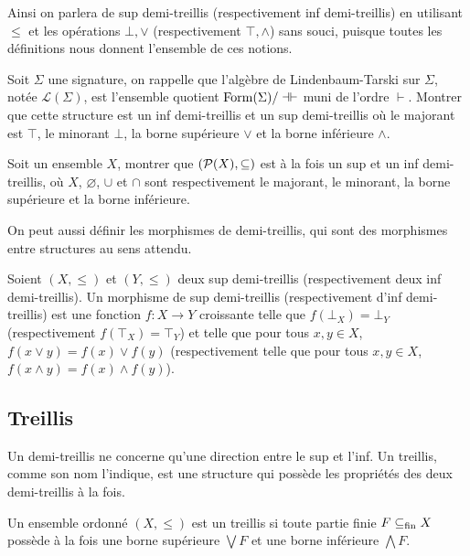 Ainsi on parlera de sup demi-treillis (respectivement inf demi-treillis) en
utilisant $\leq$ et les opérations $\bot,\lor$ (respectivement $\top,\land$) sans
souci, puisque toutes les définitions nous donnent l'ensemble de ces notions.

\begin{exercise}
  Soit $\Sigma$ une signature, on rappelle que l'algèbre de Lindenbaum-Tarski
  sur $\Sigma$, notée $\mathcal L(\Sigma)$, est l'ensemble quotient
  $\operatorname{Form}(\Sigma)/\dashv\vdash$ muni de l'ordre $\vdash$. Montrer que
  cette structure est un inf demi-treillis et un sup demi-treillis où le majorant
  est $\top$, le minorant $\bot$, la borne supérieure $\lor$ et la borne
  inférieure $\land$.
\end{exercise}

\begin{exercise}
  Soit un ensemble $X$, montrer que $(\mathcal{P}(X),\subseteq)$ est à la fois un
  sup et un inf demi-treillis, où $X$, $\varnothing$, $\cup$ et $\cap$ sont
  respectivement le majorant, le minorant, la borne supérieure et la borne
  inférieure.
\end{exercise}

On peut aussi définir les morphismes de demi-treillis, qui sont des morphismes
entre structures au sens attendu.

\begin{definition}
  Soient $(X,\leq)$ et $(Y,\leq)$ deux sup demi-treillis (respectivement deux
  inf demi-treillis). Un morphisme de sup demi-treillis (respectivement d'inf
  demi-treillis) est une fonction $f : X \to Y$ croissante telle que
  $f(\bot_X) = \bot_Y$ (respectivement $f(\top_X) = \top_Y$) et telle que pour
  tous $x,y\in X$, $f(x\lor y) = f(x)\lor f(y)$ (respectivement telle que pour
  tous $x,y\in X$, $f(x\land y) = f(x)\land f(y)$).
\end{definition}

\subsection{Treillis}

Un demi-treillis ne concerne qu'une direction entre le sup et l'inf. Un treillis,
comme son nom l'indique, est une structure qui possède les propriétés des deux
demi-treillis à la fois.

\begin{definition}[Treillis]
  Un ensemble ordonné $(X,\leq)$ est un treillis si toute partie finie
  $F\subseteq_{\mathrm{fin}} X$ possède à la fois une borne supérieure $\bigvee F$ et une borne
  inférieure $\bigwedge F$.
\end{definition}

